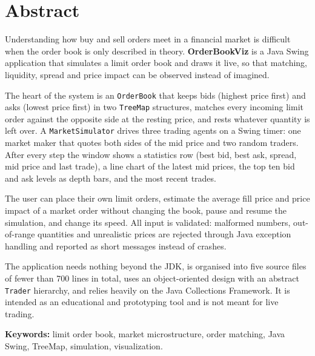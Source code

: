 \documentclass[12pt,a4paper,openany,oneside]{report}
\newcommand{\projectTitle}{OrderBookViz}
\newcommand{\code}[1]{\texttt{#1}}
\begin{document}
\chapter*{Abstract}

Understanding how buy and sell orders meet in a financial market is difficult when the order book is only described in theory. \textbf{\projectTitle} is a Java Swing application that simulates a limit order book and draws it live, so that matching, liquidity, spread and price impact can be observed instead of imagined.

The heart of the system is an \code{OrderBook} that keeps bids (highest price first) and asks (lowest price first) in two \code{TreeMap} structures, matches every incoming limit order against the opposite side at the resting price, and rests whatever quantity is left over. A \code{MarketSimulator} drives three trading agents on a Swing timer: one market maker that quotes both sides of the mid price and two random traders. After every step the window shows a statistics row (best bid, best ask, spread, mid price and last trade), a line chart of the latest mid prices, the top ten bid and ask levels as depth bars, and the most recent trades.

The user can place their own limit orders, estimate the average fill price and price impact of a market order without changing the book, pause and resume the simulation, and change its speed. All input is validated: malformed numbers, out-of-range quantities and unrealistic prices are rejected through Java exception handling and reported as short messages instead of crashes.

The application needs nothing beyond the JDK, is organised into five source files of fewer than 700 lines in total, uses an object-oriented design with an abstract \code{Trader} hierarchy, and relies heavily on the Java Collections Framework. It is intended as an educational and prototyping tool and is not meant for live trading.

\textbf{Keywords:} limit order book, market microstructure, order matching, Java Swing, TreeMap, simulation, visualization.

\tableofcontents
\end{document}
